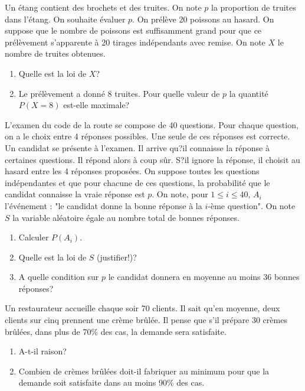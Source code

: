 \documentclass{book}
\begin{document}
\begin{Exercice}
Un étang contient des brochets et des truites. On note $p$ la proportion de truites dans l'étang. On souhaite évaluer $p$. On prélève 20 poissons au hasard. On suppose que le nombre de poissons est suffisamment grand pour que ce prélèvement s'apparente à 20 tirages indépendants avec remise. On note $X$ le nombre de truites obtenues.
\begin{enumerate}
\item Quelle est la loi de $X$?
\item Le prélèvement a donné $8$ truites. Pour quelle valeur de $p$ la quantité $P(X=8)$ est-elle maximale?
\end{enumerate}
\end{Exercice}

\begin{Exercice}
L'examen du code de la route se compose de 40 questions. Pour chaque question, on a le choix entre 4 réponses possibles. Une seule de ces réponses est correcte. Un candidat se présente à l'examen. Il arrive qu?il connaisse la réponse
à certaines questions. Il répond alors à coup sûr. S?il ignore la réponse, il
choisit au hasard entre les 4 réponses proposées. On suppose toutes les questions
indépendantes et que pour chacune de ces questions, la probabilité que
le candidat connaisse la vraie réponse est $p$. On note, pour $1\leq i\leq 40$, $A_i$ l'événement : "le candidat donne la bonne réponse à la $i$-ème 
question". On note $S$ la variable aléatoire égale au nombre total de bonnes réponses.
\begin{enumerate}
\item Calculer $P(A_i)$.
\item Quelle est la loi de $S$ (justifier!)?
\item A quelle condition sur $p$ le candidat donnera en moyenne au moins 36 bonnes réponses?
\end{enumerate}
\end{Exercice}

\begin{Exercice}[Restaurateur]
Un restaurateur accueille chaque soir 70 clients. Il sait qu'en moyenne, deux clients sur cinq prennent une crème brûlée. Il pense que s'il prépare 30 crèmes brûlées, dans plus de 70\% des cas, la demande sera satisfaite.
\begin{enumerate}
\item A-t-il raison?
\item Combien de crèmes brûlées doit-il fabriquer au minimum pour que la demande soit satisfaite dans au moins 90\% des cas.
\end{enumerate}
\end{Exercice}
\end{document}
